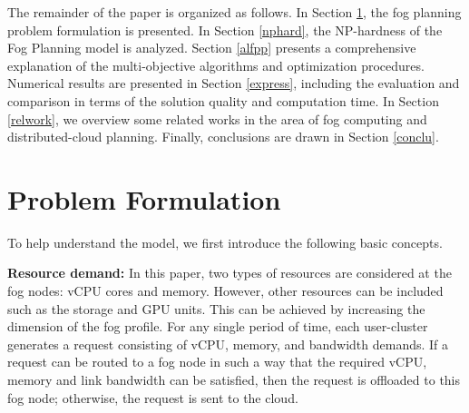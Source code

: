 \documentclass[10pt,journal,compsoc]{IEEEtran}
\begin{document}


The remainder of the paper is organized as follows. In Section \ref{probfor}, the fog planning problem formulation is presented. In Section \ref{nphard}, the NP-hardness of the Fog Planning model is analyzed. Section \ref{alfpp} presents a comprehensive explanation of the multi-objective algorithms and optimization procedures. 
Numerical results are presented in Section \ref{express}, including the evaluation and comparison in terms of the solution quality and computation time. In Section \ref{relwork}, we overview some related works in the area of fog computing and distributed-cloud planning. Finally, conclusions are drawn in Section \ref{conclu}.

\section{Problem Formulation}\label{probfor}
To help understand the model, we first introduce the following basic concepts.



\textbf{Resource demand: }In this paper, two types of resources are considered at the fog nodes: vCPU cores and memory. 
However, other resources can be included such as the storage and GPU units. This can be achieved by increasing the dimension of the fog profile. For any single period of time, each user-cluster generates a request consisting of vCPU, memory, and bandwidth demands. If a request can be routed to a fog node in such a way that the required vCPU, memory and link bandwidth can be satisfied, then the request is offloaded to this fog node; otherwise, the request is sent to the cloud. 
\end{document}
